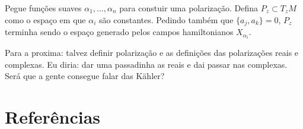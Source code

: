 Pegue funções suaves $\alpha_1,\ldots,\alpha_n$ para constuir uma polarização. Defina $P_z\subset T_zM$  como o espaço em que $\alpha_i$ são constantes. Pedindo também que $\{a_j,a_k\}=0$, $P_z$ terminha sendo o espaço generado pelos campos hamiltonianos $X_{\alpha_i}$.

Para a proxima: talvez definir polarização e as definições das polarizações reais e complexas. Eu diria: dar uma passadinha as reais e dai passar nas complexas. Será que a gente consegue falar das Kähler?
\fi

\section*{Referências}
\printbibliography[heading=none]

